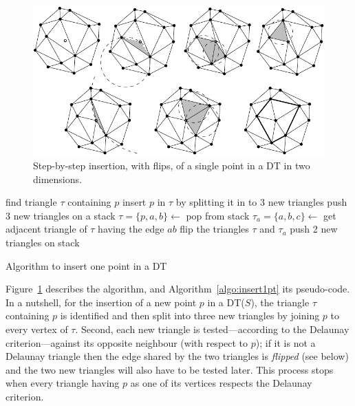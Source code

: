 \begin{figure}
  \centering
  \includegraphics[width=1.0\textwidth]{figs/insertion_steps}
  \caption{Step-by-step insertion, with flips, of a single point in a DT in two dimensions.}
\label{fig:insertion_steps}
\end{figure}
\begin{algorithm}[tb] 
  \DontPrintSemicolon
  find triangle $\tau$ containing $p$\;
  insert $p$ in $\tau$ by splitting it in to 3 new triangles\;
  push 3 new triangles on a stack\;
  {
    $\tau = \{p,a,b\} \leftarrow$ pop from stack\;
    $\tau_{a} = \{a,b,c\} \leftarrow$ get adjacent triangle of $\tau$ having the edge $ab$\;
    {
      flip the triangles $\tau$ and $\tau_{a}$\;
      push 2 new triangles on stack\;
    }
  }
  \caption{Algorithm to insert one point in a DT}
\label{algo:insert1pt}
\end{algorithm} 

Figure~\ref{fig:insertion_steps} describes the algorithm, and Algorithm~\ref{algo:insert1pt} its pseudo-code. 
In a nutshell, for the insertion of a new point $p$ in a DT($S$), the triangle $\tau$ containing $p$ is identified and then split into three new triangles by joining $p$ to every vertex of $\tau$. 
Second, each new triangle is tested---according to the Delaunay criterion---against its opposite neighbour (with respect to $p$); if it is not a Delaunay triangle then the edge shared by the two triangles is \emph{flipped} (see below) and the two new triangles will also have to be tested later. 
This process stops when every triangle having $p$ as one of its vertices respects the Delaunay criterion.


